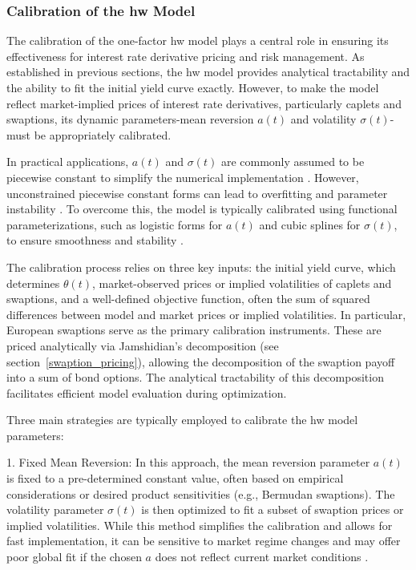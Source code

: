 \subsubsection{Calibration of the \ac{hw} Model}
\label{calibration}
The calibration of the one-factor \ac{hw} model plays a central role in ensuring its effectiveness for interest rate derivative pricing and risk management. As established in previous sections, the \ac{hw} model provides analytical tractability and the ability to fit the initial yield curve exactly. However, to make the model reflect market-implied prices of interest rate derivatives, particularly caplets and swaptions, its dynamic parameters-mean reversion $a(t)$ and volatility $\sigma(t)$-must be appropriately calibrated.

In practical applications, $a(t)$ and $\sigma(t)$ are commonly assumed to be piecewise constant to simplify the numerical implementation \parencite[p.~7]{gurrieri2009calibration}. However, unconstrained piecewise constant forms can lead to overfitting and parameter instability \parencite[p.~2]{gurrieri2009calibration}. To overcome this, the model is typically calibrated using functional parameterizations, such as logistic forms for $a(t)$ and cubic splines for $\sigma(t)$, to ensure smoothness and stability \parencite[p.~8]{gurrieri2009calibration}.

The calibration process relies on three key inputs: the initial yield curve, which determines $\theta(t)$, market-observed prices or implied volatilities of caplets and swaptions, and a well-defined objective function, often the sum of squared differences between model and market prices or implied volatilities. In particular, European swaptions serve as the primary calibration instruments. These are priced analytically via Jamshidian's decomposition (see section~\ref{swaption_pricing}), allowing the decomposition of the swaption payoff into a sum of bond options. The analytical tractability of this decomposition facilitates efficient model evaluation during optimization.

Three main strategies are typically employed to calibrate the \ac{hw} model parameters:

1. Fixed Mean Reversion: In this approach, the mean reversion parameter $a(t)$ is fixed to a pre-determined constant value, often based on empirical considerations or desired product sensitivities (e.g., Bermudan swaptions). The volatility parameter $\sigma(t)$ is then optimized to fit a subset of swaption prices or implied volatilities. While this method simplifies the calibration and allows for fast implementation, it can be sensitive to market regime changes and may offer poor global fit if the chosen $a$ does not reflect current market conditions \parencite[p.~13]{gurrieri2009calibration}.

